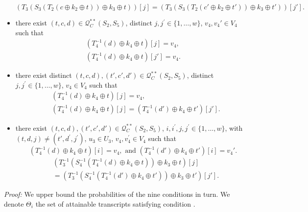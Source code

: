 \begin{itemize}
$$
  \left(T_{3}\left(S_{3}\left(T_2\left(c \oplus k_{2} \oplus t\right)\right) \oplus k_{3} \oplus t\right)\right)[j] = \left(T_{3}\left(S_{3}\left(T_2\left(c' \oplus k_{2} \oplus t'\right)\right) \oplus k_{3} \oplus t'\right)\right)[j'].
$$
  \item[\hseven]
  there exist $(t, c, d) \in \mathcal{Q}_{C}^{**}\left(S_{2}, S_{5}\right)$, distinct $j, j^{\prime}\in\{1, \ldots, w\}$, $v_{4},v_{4}' \in V_{4}$ such that
  $$
  \begin{aligned}  
 \left(T_{4}^{-1}\left(d \right) \oplus k_{4} \oplus t\right)[j] = v_4, \\
  \left(T_{4}^{-1}\left(d \right) \oplus k_{4} \oplus t\right)[j'] = v_4.
  \end{aligned}
  $$
  \item[\height]
  there exist distinct $(t, c, d),(t', c', d') \in \mathcal{Q}_{C}^{**}\left(S_{2}, S_{5}\right)$, distinct $j, j^{\prime}\in\{1, \ldots, w\}$, $v_{4} \in V_{4}$ such that
  $$
  \begin{aligned}
  &\left(T_{4}^{-1}\left(d \right) \oplus k_{4} \oplus t\right)[j] = v_4, \\
  &\left(T_{4}^{-1}\left(d \right) \oplus k_{4} \oplus t\right)[j] = \left(T_{4}^{-1}\left(d' \right) \oplus k_{4} \oplus t'\right)[j'].
  \end{aligned}
  $$
  \item[\hnine]
  there exist $(t, c, d), (t', c', d') \in \mathcal{Q}_{C}^{**}\left(S_{2}, S_{5}\right)$, $i, i^{\prime}, j, j^{\prime} \in\{1, \ldots, w\}$, with$(t, d, j) \neq \left(t', d^{\prime}, j^{\prime}\right)$, $u_{3} \in U_{3}$, $v_{4},v_{4}^{\prime} \in V_{4}$ such that 
  $$
 \left(T_{4}^{-1}\left(d \right) \oplus k_{4} \oplus t\right)[i] = v_4, \text{ and }
  \left(T_{4}^{-1}\left(d' \right) \oplus k_{4} \oplus t'\right)[i] = v_4'. $$ 
  $$
\begin{aligned}
  &\left(T_{3}^{-1}\left(S_{4}^{-1}\left(T_{4}^{-1}\left(d\right) \oplus k_{4} \oplus t\right)\right) \oplus k_{3} \oplus t\right)[j] \\
  &=  \left(T_{3}^{-1}\left(S_{4}^{-1}\left(T_{4}^{-1}\left(d'\right) \oplus k_{4} \oplus t'\right)\right) \oplus k_{3} \oplus t'\right)[j'].
\end{aligned}
$$
\end{itemize}

\noindent \emph{Proof:} We upper bound the probabilities of the nine conditions in turn. We denote $\Theta_i$ the set of attainable transcripts satisfying condition \hi.\\

